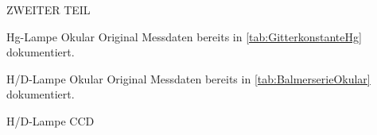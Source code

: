 \begin{appendix}
\begin{chapter}{ZWEITER TEIL}
      \begin{section}{Hg-Lampe Okular}
        \label{Anhang:chp:ZWEITERTEIL:sec:HgLampeOkular}
        Original Messdaten bereits in \cref{tab:GitterkonstanteHg}
        dokumentiert.
        
      \end{section}
      
     
     
      \begin{section}{H/D-Lampe Okular}
        \label{Anhang:chp:ZWEITERTEIL:sec:HDLampeOkular}
        Original Messdaten bereits in \cref{tab:BalmerserieOkular} 
        dokumentiert.
      
      \end{section}
      
     
     
      \begin{section}{H/D-Lampe CCD}
        \label{Anhang:chp:ZWEITERTEIL:sec:HDLampeCCD}
        

\end{section}
\end{chapter}
\end{appendix}
